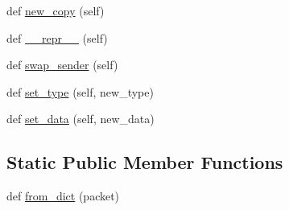 \begin{DoxyCompactItemize}
\item 
def \hyperlink{classparlai_1_1mturk_1_1core_1_1dev_1_1socket__manager_1_1Packet_adde61fc0d58a62c2446fe8ea54adb02e}{new\+\_\+copy} (self)
\item 
def \hyperlink{classparlai_1_1mturk_1_1core_1_1dev_1_1socket__manager_1_1Packet_add796297ba2304710fade256bf5e0adf}{\+\_\+\+\_\+repr\+\_\+\+\_\+} (self)
\item 
def \hyperlink{classparlai_1_1mturk_1_1core_1_1dev_1_1socket__manager_1_1Packet_a52713ae6c40a1c3ef54c309baee5f092}{swap\+\_\+sender} (self)
\item 
def \hyperlink{classparlai_1_1mturk_1_1core_1_1dev_1_1socket__manager_1_1Packet_afd43b3b84a5266bd3aaedc63a304e5a8}{set\+\_\+type} (self, new\+\_\+type)
\item 
def \hyperlink{classparlai_1_1mturk_1_1core_1_1dev_1_1socket__manager_1_1Packet_a73e956631f9f7da69ec03301147f8517}{set\+\_\+data} (self, new\+\_\+data)
\end{DoxyCompactItemize}
\subsection*{Static Public Member Functions}
\begin{DoxyCompactItemize}
\item 
def \hyperlink{classparlai_1_1mturk_1_1core_1_1dev_1_1socket__manager_1_1Packet_a02cdee81b0dbf9f893da7f288eadf1ea}{from\+\_\+dict} (packet)
\end{DoxyCompactItemize}
